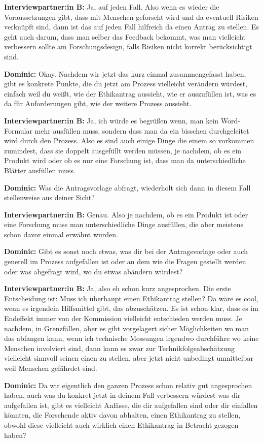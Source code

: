 \documentclass[a4paper,12pt,twoside]{scrreprt}
\begin{document}
\textbf{Interviewpartner:in B:} Ja, auf jeden Fall. Also wenn es wieder die Voraussetzungen gibt, dass mit Menschen geforscht wird und da eventuell Risiken verknüpft sind, dann ist das auf jeden Fall hilfreich da einen Antrag zu stellen. Es geht auch darum, dass man selber das Feedback bekommt, was man vielleicht verbessern sollte am Forschungsdesign, falls Risiken nicht korrekt berücksichtigt sind.

\textbf{Dominic:} Okay. Nachdem wir jetzt das kurz einmal zusammengefasst haben, gibt es konkrete Punkte, die du jetzt am Prozess vielleicht verändern würdest, einfach weil du weißt, wie der Ethikantrag aussieht, wie er auszufüllen ist, was es da für Anforderungen gibt, wie der weitere Prozess aussieht.

\textbf{Interviewpartner:in B:} Ja, ich würde es begrüßen wenn, man kein Word-Formular mehr ausfüllen muss, sondern dass man da ein bisschen durchgeleitet wird durch den Prozess. Also es sind auch einige Dinge die einem so vorkommen zumindest, dass sie doppelt ausgefüllt werden müssen, je nachdem, ob es ein Produkt wird oder ob es nur eine Forschung ist, dass man da unterschiedliche Blätter ausfüllen muss.

\textbf{Dominic:} Was die Antragsvorlage abfragt, wiederholt sich dann in diesem Fall stellenweise aus deiner Sicht?

\textbf{Interviewpartner:in B:} Genau. Also je nachdem, ob es ein Produkt ist oder eine Forschung muss man unterschiedliche Dinge ausfüllen, die aber meistens schon davor einmal erwähnt wurden.

\textbf{Dominic:} Gibt es sonst noch etwas, was dir bei der Antragsvorlage oder auch generell im Prozess aufgefallen ist oder an dem wie die Fragen gestellt werden oder was abgefragt wird, wo du etwas abändern würdest?

\textbf{Interviewpartner:in B:} Ja, also eh schon kurz angesprochen. Die erste Entscheidung ist: Muss ich überhaupt einen Ethikantrag stellen? Da wäre es cool, wenn es irgendein Hilfsmittel gibt, das abzuschätzen. Es ist schon klar, dass es im Endeffekt immer von der Kommission vielleicht entschieden werden muss. Je nachdem, in Grenzfällen, aber es gibt vorgelagert sicher Möglichkeiten wo man das abfangen kann, wenn ich technische Messungen irgendwo durchführe wo keine Menschen involviert sind, dann kann es zwar zur Technikfolgeabschätzung vielleicht sinnvoll seinen einen zu stellen, aber jetzt nicht unbedingt unmittelbar weil Menschen gefährdet sind.

\textbf{Dominic:} Da wir eigentlich den ganzen Prozess schon relativ gut angesprochen haben, auch was du konkret jetzt in deinem Fall verbessern würdest was dir aufgefallen ist, gibt es vielleicht Anlässe, die dir aufgefallen sind oder dir einfallen könnten, die Forschende aktiv davon abhalten, einen Ethikantrag zu stellen, obwohl diese vielleicht auch wirklich einen Ethikantrag in Betracht gezogen haben?
\end{document}
